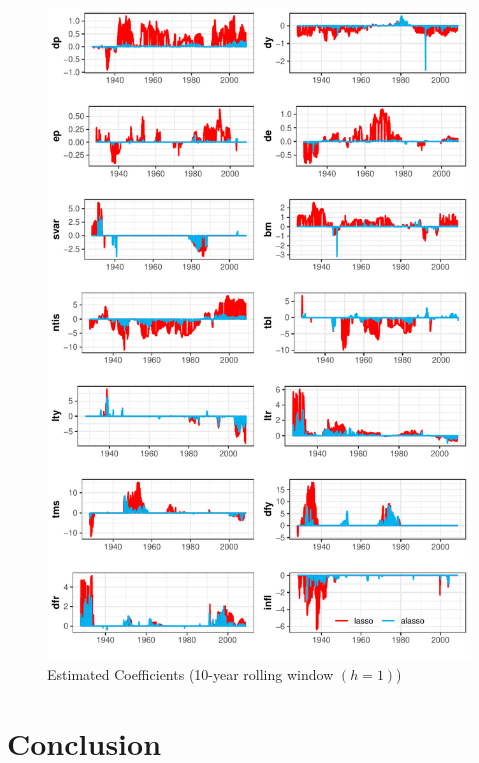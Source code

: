 \documentclass[12pt,a4paper]{article}
\begin{document}
\begin{figure}
\begin{center}
		\caption{Estimated Coefficients (10-year rolling window $ (h = 1) $)}
		\label{fig:4} 
		\includegraphics[scale = 0.88]{selection_graph.pdf}
\end{center}
\end{figure}

\section{Conclusion}
\end{document}

